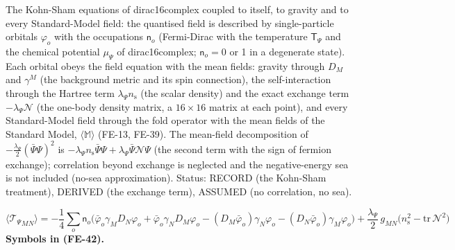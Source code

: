 \documentclass[
  10pt,
]{article}
\begin{document}
The Kohn-Sham equations of dirac16complex coupled to itself, to gravity
and to every Standard-Model field: the quantised field is described by
single-particle orbitals \(\varphi_o\) with the occupations
\(\mathsf{n}_o\) (Fermi-Dirac with the temperature \(\mathsf{T}_\Psi\)
and the chemical potential \(\mu_\Psi\) of dirac16complex;
\(\mathsf{n}_o = 0\) or 1 in a degenerate state). Each orbital obeys the
field equation with the mean fields: gravity through \(D_M\) and
\(\gamma^M\) (the background metric and its spin connection), the
self-interaction through the Hartree term
\(\lambda_\Psi n_{\mathrm{s}}\) (the scalar density) and the exact
exchange term \(-\lambda_\Psi\mathcal{N}\) (the one-body density matrix,
a \(16 \times 16\) matrix at each point), and every Standard-Model field
through the fold operator with the mean fields of the Standard Model,
\(\langle\mathbb{M}\rangle\) (FE-13, FE-39). The mean-field
decomposition of \(-\frac{\lambda_\Psi}{2}(\bar\Psi\Psi)^2\) is
\(-\lambda_\Psi n_{\mathrm{s}}\bar\Psi\Psi + \lambda_\Psi\bar\Psi\mathcal{N}\Psi\)
(the second term with the sign of fermion exchange); correlation beyond
exchange is neglected and the negative-energy sea is not included
(no-sea approximation). Status: RECORD (the Kohn-Sham treatment),
DERIVED (the exchange term), ASSUMED (no correlation, no sea).

\[
\langle{\mathcal{T}_\Psi}_{MN}\rangle = -\frac14\sum_o\mathsf{n}_o\Big(\bar\varphi_o\gamma_MD_N\varphi_o + \bar\varphi_o\gamma_ND_M\varphi_o
 - (D_M\bar\varphi_o)\gamma_N\varphi_o - (D_N\bar\varphi_o)\gamma_M\varphi_o\Big) + \frac{\lambda_\Psi}{2}\,g_{MN}\big(n_{\mathrm{s}}^2 - \mathrm{tr}\,\mathcal{N}^2\big) \tag{FE-42}
\] \textbf{Symbols in (FE-42).}
\end{document}
